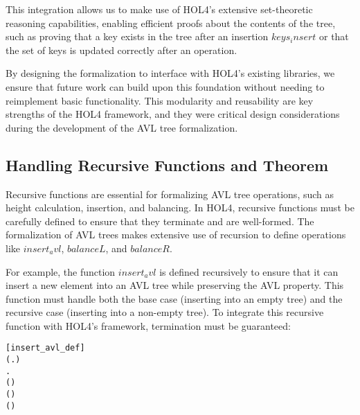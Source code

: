 This integration allows us to make use of HOL4’s extensive set-theoretic reasoning capabilities, enabling efficient proofs about the contents of the tree, such as proving that a key exists in the tree after an insertion \(keys_insert\) or that the set of keys is updated correctly after an operation.

By designing the formalization to interface with HOL4’s existing libraries, we ensure that future work can build upon this foundation without needing to reimplement basic functionality. This modularity and reusability are key strengths of the HOL4 framework, and they were critical design considerations during the development of the AVL tree formalization.

\subsection{Handling Recursive Functions and Theorem}

Recursive functions are essential for formalizing AVL tree operations, such as height calculation, insertion, and balancing. In HOL4, recursive functions must be carefully defined to ensure that they terminate and are well-formed. The formalization of AVL trees makes extensive use of recursion to define operations like \(insert_avl\), \(balanceL\), and \(balanceR\).

For example, the function \(insert_avl\) is defined recursively to ensure that it can insert a new element into an AVL tree while preserving the AVL property. This function must handle both the base case (inserting into an empty tree) and the recursive case (inserting into a non-empty tree). To integrate this recursive function with HOL4’s framework, termination must be guaranteed:

\begin{alltt}
	[insert_avl_def]
	\HOLTokenTurnstile{} (\HOLSymConst{\HOLTokenForall{}} .     \HOLSymConst{=}   ) \HOLSymConst{\HOLTokenConj{}}
   \HOLSymConst{\HOLTokenForall{}}      .
        (     ) \HOLSymConst{=}
       \HOLSymConst{=}        
        \HOLSymConst{\HOLTokenLt{}}      (   ) 
          (   )
\end{alltt}

